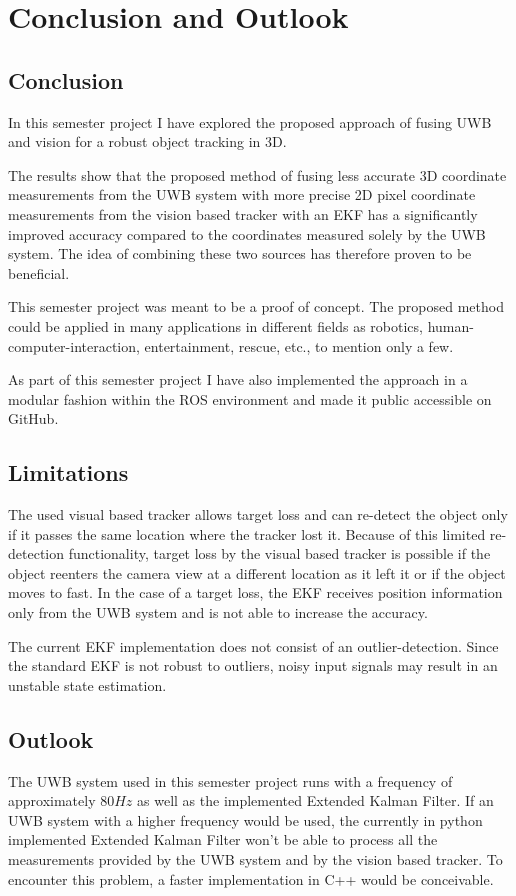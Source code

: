 \chapter{Conclusion and Outlook}

\section{Conclusion}
In this semester project I have explored the proposed approach of fusing \ac{UWB} and vision for a robust object tracking in 3D.

The results show that the proposed method of fusing less accurate 3D coordinate measurements from the \ac{UWB} system with more precise 2D pixel coordinate measurements from the vision based tracker with an \acf{EKF} has a significantly improved accuracy compared to the coordinates measured solely by the \ac{UWB} system. The idea of combining these two sources has therefore proven to be beneficial.

This semester project was meant to be a proof of concept. The proposed method could be applied in many applications in different fields as robotics, human-computer-interaction, entertainment, rescue, etc., to mention only a few.

As part of this semester project I have also implemented the approach in a modular fashion within the \ac{ROS} environment and made it public accessible on GitHub\cite{Ziegler:2016}.

\section{Limitations}
The used visual based tracker allows target loss and can re-detect the object only if it passes the same location where the tracker lost it. Because of this limited re-detection functionality, target loss by the visual based tracker is possible if the object reenters the camera view at a different location as it left it or if the object moves to fast. In the case of a target loss, the \ac{EKF} receives position information only from the \ac{UWB} system and is not able to increase the accuracy.

The current \ac{EKF} implementation does not consist of an outlier-detection. Since the standard \ac{EKF} is not robust to outliers, noisy input signals may result in an unstable state estimation. 


\section{Outlook}\textsl{}
The \ac{UWB} system used in this semester project runs with a frequency of approximately $80\mathit{Hz}$ as well as the implemented Extended Kalman Filter. If an \ac{UWB} system with a higher frequency would be used, the currently in python implemented Extended Kalman Filter won't be able to process all the measurements provided by the \ac{UWB} system and by the vision based tracker. To encounter this problem, a faster implementation in C++ would be conceivable.

